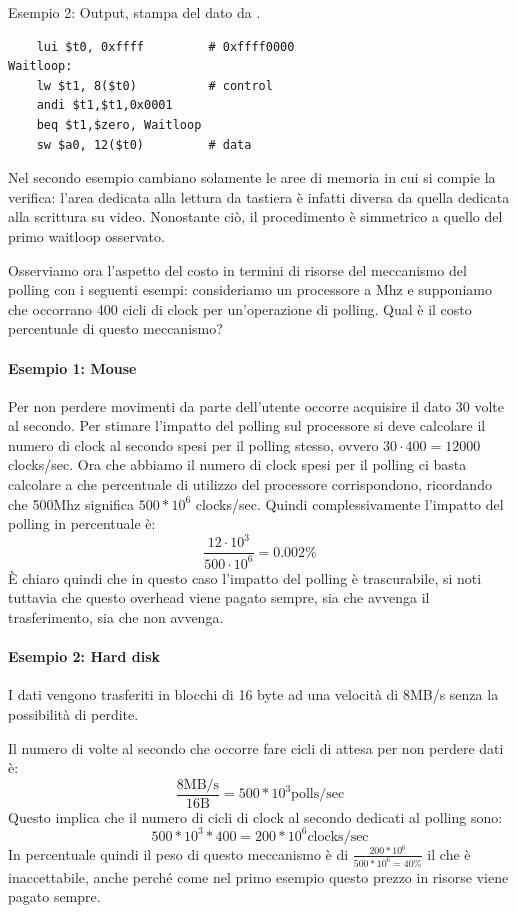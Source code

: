 \documentclass[class=book, crop=false, oneside]{standalone}
\begin{document}
Esempio 2: Output, stampa del dato da .
\begin{verbatim}
	lui $t0, 0xffff         # 0xffff0000
Waitloop:
	lw $t1, 8($t0)          # control
	andi $t1,$t1,0x0001
	beq $t1,$zero, Waitloop
	sw $a0, 12($t0)         # data
\end{verbatim}
Nel secondo esempio cambiano solamente le aree di memoria in cui si compie la verifica: l'area dedicata alla lettura da tastiera è infatti diversa da quella dedicata alla scrittura su video. Nonostante ciò, il procedimento è simmetrico a quello del primo waitloop osservato.

Osserviamo ora l'aspetto del costo in termini di risorse del meccanismo del polling con i seguenti esempi: consideriamo un processore a \unit[500]{Mhz} e supponiamo che occorrano 400 cicli di clock per un'operazione di polling. Qual è il costo percentuale di questo meccanismo?

\paragraph{Esempio 1: Mouse} Per non perdere movimenti da parte dell'utente occorre acquisire il dato 30 volte al secondo. Per stimare l'impatto del polling sul processore si deve calcolare il numero di clock al secondo spesi per il polling stesso, ovvero \(30\cdot 400 = 12000\) clocks/sec. Ora che abbiamo il numero di clock spesi per il polling ci basta calcolare a che percentuale di utilizzo del processore corrispondono, ricordando che 500Mhz significa \(500*10^{6}\) clocks/sec. Quindi complessivamente l'impatto del polling in percentuale è:
\begin{equation*}
	\frac{12\cdot 10^3}{500\cdot 10^6}=0.002\%
\end{equation*}
È chiaro quindi che in questo caso l'impatto del polling è trascurabile, si noti tuttavia che questo overhead viene pagato sempre, sia che avvenga il trasferimento, sia che non avvenga.

\paragraph{Esempio 2: Hard disk} I dati vengono trasferiti in blocchi di 16 byte ad una velocità di \unit{8}{MB/s} senza la possibilità di perdite.

Il numero di volte al secondo che occorre fare cicli di attesa per non perdere dati è:
\begin{equation*}
	\frac{8\textrm{MB/s}}{16\textrm{B}} = 500*10^{3} \textrm{polls/sec}
\end{equation*}
Questo implica che il numero di cicli di clock al secondo dedicati al polling sono:
\begin{equation*}
	500*10^{3}*400 = 200*10^{6} \textrm{clocks/sec}
\end{equation*}
In percentuale quindi il peso di questo meccanismo è di \(\frac{200*10^6}{500*10^6=40\%}\) il che è inaccettabile, anche perché come nel primo esempio questo prezzo in risorse viene pagato sempre.
\end{document}
